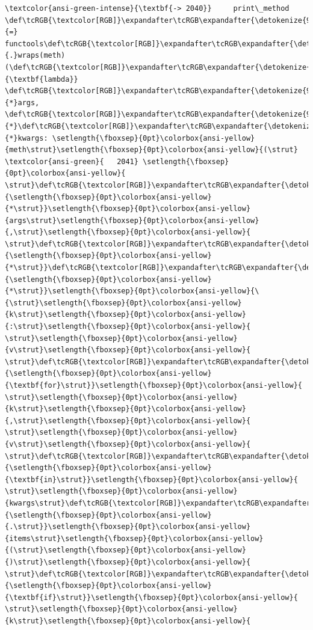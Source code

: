 \documentclass[11pt]{article}
\begin{document}
\begin{Verbatim}[commandchars=\\\{\}, frame=single, framerule=2mm, rulecolor=\color{outerrorbackground}]
\textcolor{ansi-green-intense}{\textbf{-> 2040}}     print\_method \def\tcRGB{\textcolor[RGB]}\expandafter\tcRGB\expandafter{\detokenize{98,98,98}}{=} functools\def\tcRGB{\textcolor[RGB]}\expandafter\tcRGB\expandafter{\detokenize{98,98,98}}{.}wraps(meth)(\def\tcRGB{\textcolor[RGB]}\expandafter\tcRGB\expandafter{\detokenize{0,135,0}}{\textbf{lambda}} \def\tcRGB{\textcolor[RGB]}\expandafter\tcRGB\expandafter{\detokenize{98,98,98}}{*}args, \def\tcRGB{\textcolor[RGB]}\expandafter\tcRGB\expandafter{\detokenize{98,98,98}}{*}\def\tcRGB{\textcolor[RGB]}\expandafter\tcRGB\expandafter{\detokenize{98,98,98}}{*}kwargs: \setlength{\fboxsep}{0pt}\colorbox{ansi-yellow}{meth\strut}\setlength{\fboxsep}{0pt}\colorbox{ansi-yellow}{(\strut}
\textcolor{ansi-green}{   2041} \setlength{\fboxsep}{0pt}\colorbox{ansi-yellow}{        \strut}\def\tcRGB{\textcolor[RGB]}\expandafter\tcRGB\expandafter{\detokenize{98,98,98}}{\setlength{\fboxsep}{0pt}\colorbox{ansi-yellow}{*\strut}}\setlength{\fboxsep}{0pt}\colorbox{ansi-yellow}{args\strut}\setlength{\fboxsep}{0pt}\colorbox{ansi-yellow}{,\strut}\setlength{\fboxsep}{0pt}\colorbox{ansi-yellow}{ \strut}\def\tcRGB{\textcolor[RGB]}\expandafter\tcRGB\expandafter{\detokenize{98,98,98}}{\setlength{\fboxsep}{0pt}\colorbox{ansi-yellow}{*\strut}}\def\tcRGB{\textcolor[RGB]}\expandafter\tcRGB\expandafter{\detokenize{98,98,98}}{\setlength{\fboxsep}{0pt}\colorbox{ansi-yellow}{*\strut}}\setlength{\fboxsep}{0pt}\colorbox{ansi-yellow}{\{\strut}\setlength{\fboxsep}{0pt}\colorbox{ansi-yellow}{k\strut}\setlength{\fboxsep}{0pt}\colorbox{ansi-yellow}{:\strut}\setlength{\fboxsep}{0pt}\colorbox{ansi-yellow}{ \strut}\setlength{\fboxsep}{0pt}\colorbox{ansi-yellow}{v\strut}\setlength{\fboxsep}{0pt}\colorbox{ansi-yellow}{ \strut}\def\tcRGB{\textcolor[RGB]}\expandafter\tcRGB\expandafter{\detokenize{0,135,0}}{\setlength{\fboxsep}{0pt}\colorbox{ansi-yellow}{\textbf{for}\strut}}\setlength{\fboxsep}{0pt}\colorbox{ansi-yellow}{ \strut}\setlength{\fboxsep}{0pt}\colorbox{ansi-yellow}{k\strut}\setlength{\fboxsep}{0pt}\colorbox{ansi-yellow}{,\strut}\setlength{\fboxsep}{0pt}\colorbox{ansi-yellow}{ \strut}\setlength{\fboxsep}{0pt}\colorbox{ansi-yellow}{v\strut}\setlength{\fboxsep}{0pt}\colorbox{ansi-yellow}{ \strut}\def\tcRGB{\textcolor[RGB]}\expandafter\tcRGB\expandafter{\detokenize{175,0,255}}{\setlength{\fboxsep}{0pt}\colorbox{ansi-yellow}{\textbf{in}\strut}}\setlength{\fboxsep}{0pt}\colorbox{ansi-yellow}{ \strut}\setlength{\fboxsep}{0pt}\colorbox{ansi-yellow}{kwargs\strut}\def\tcRGB{\textcolor[RGB]}\expandafter\tcRGB\expandafter{\detokenize{98,98,98}}{\setlength{\fboxsep}{0pt}\colorbox{ansi-yellow}{.\strut}}\setlength{\fboxsep}{0pt}\colorbox{ansi-yellow}{items\strut}\setlength{\fboxsep}{0pt}\colorbox{ansi-yellow}{(\strut}\setlength{\fboxsep}{0pt}\colorbox{ansi-yellow}{)\strut}\setlength{\fboxsep}{0pt}\colorbox{ansi-yellow}{ \strut}\def\tcRGB{\textcolor[RGB]}\expandafter\tcRGB\expandafter{\detokenize{0,135,0}}{\setlength{\fboxsep}{0pt}\colorbox{ansi-yellow}{\textbf{if}\strut}}\setlength{\fboxsep}{0pt}\colorbox{ansi-yellow}{ \strut}\setlength{\fboxsep}{0pt}\colorbox{ansi-yellow}{k\strut}\setlength{\fboxsep}{0pt}\colorbox{ansi-yellow}{ 
\end{Verbatim}
\end{document}
